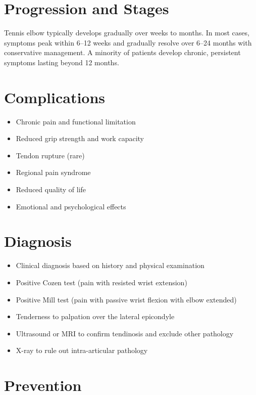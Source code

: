 \section{Progression and Stages}
Tennis elbow typically develops gradually over weeks to months. In most cases, symptoms peak within 6--12 weeks and gradually resolve over 6--24 months with conservative management. A minority of patients develop chronic, persistent symptoms lasting beyond 12 months.

\section{Complications}

\begin{itemize}[noitemsep]
  \item Chronic pain and functional limitation
  \item Reduced grip strength and work capacity
  \item Tendon rupture (rare)
  \item Regional pain syndrome
  \item Reduced quality of life
  \item Emotional and psychological effects
\end{itemize}

\section{Diagnosis}

\begin{itemize}[noitemsep]
  \item Clinical diagnosis based on history and physical examination
  \item Positive Cozen test (pain with resisted wrist extension)
  \item Positive Mill test (pain with passive wrist flexion with elbow extended)
  \item Tenderness to palpation over the lateral epicondyle
  \item Ultrasound or MRI to confirm tendinosis and exclude other pathology
  \item X-ray to rule out intra-articular pathology
\end{itemize}

\section{Prevention}

